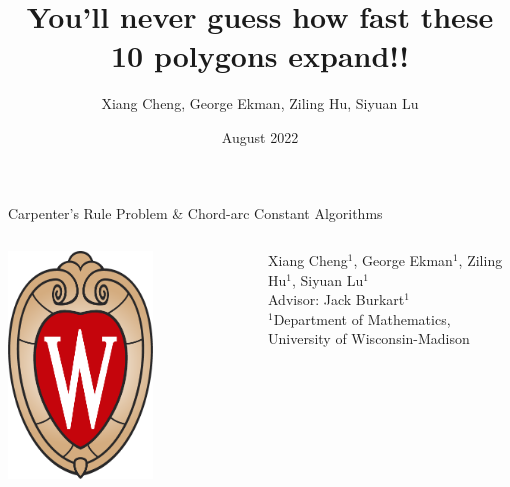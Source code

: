 \documentclass{beamer}
\title{You'll never guess how fast these 10 polygons expand!!}
\author{Xiang Cheng, George Ekman, Ziling Hu, Siyuan Lu}
\institute{University of Wisconsin-Madison}
\date{August 2022}
\begin{document}
\begin{frame}

{
    {\vspace{-1cm}
    \centering
        \Huge %
        Carpenter's Rule Problem \& Chord-arc Constant Algorithms \\
    }
    \begin{columns}
            {\centering
            \qquad
            \includegraphics[height=0.6\textwidth]{figures/uw-crest-web.png}}
            
            {\centering
            \Large Xiang Cheng$^1$, George Ekman$^1$, Ziling Hu$^1$, Siyuan Lu$^1$ \\
            \Large Advisor: Jack Burkart$^1$ \\
            \large $^1$Department of Mathematics, University of Wisconsin-Madison \\
            }
            

\end{columns}}
\end{frame}
\end{document}

